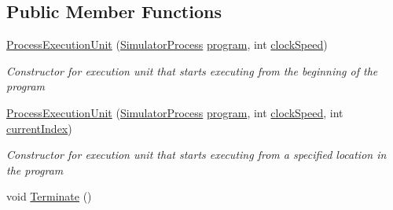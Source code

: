 \subsection*{Public Member Functions}
\begin{DoxyCompactItemize}
\item 
\hyperlink{class_c_p_u___o_s___simulator_1_1_operating___system_1_1_process_execution_unit_a96760cbf88e3fb42a51253b6e961c609}{Process\+Execution\+Unit} (\hyperlink{class_c_p_u___o_s___simulator_1_1_operating___system_1_1_simulator_process}{Simulator\+Process} \hyperlink{class_c_p_u___o_s___simulator_1_1_operating___system_1_1_process_execution_unit_ab82d2f53e3b27f272a0c5a9cc6222e9d}{program}, int \hyperlink{class_c_p_u___o_s___simulator_1_1_c_p_u_1_1_execution_unit_a0deb0a3e0c9fa402598bbf18be6535cc}{clock\+Speed})
\begin{DoxyCompactList}\small\item\em Constructor for execution unit that starts executing from the beginning of the program \end{DoxyCompactList}\item 
\hyperlink{class_c_p_u___o_s___simulator_1_1_operating___system_1_1_process_execution_unit_a89783c451bba101568a4a9b0fe09df81}{Process\+Execution\+Unit} (\hyperlink{class_c_p_u___o_s___simulator_1_1_operating___system_1_1_simulator_process}{Simulator\+Process} \hyperlink{class_c_p_u___o_s___simulator_1_1_operating___system_1_1_process_execution_unit_ab82d2f53e3b27f272a0c5a9cc6222e9d}{program}, int \hyperlink{class_c_p_u___o_s___simulator_1_1_c_p_u_1_1_execution_unit_a0deb0a3e0c9fa402598bbf18be6535cc}{clock\+Speed}, int \hyperlink{class_c_p_u___o_s___simulator_1_1_c_p_u_1_1_execution_unit_af6807cb5343acc2c40a08166c748f1f0}{current\+Index})
\begin{DoxyCompactList}\small\item\em Constructor for execution unit that starts executing from a specified location in the program \end{DoxyCompactList}\item 
void \hyperlink{class_c_p_u___o_s___simulator_1_1_operating___system_1_1_process_execution_unit_a5685d8f35ca37a904236d8e96f3aabb1}{Terminate} ()
\end{DoxyCompactItemize}
